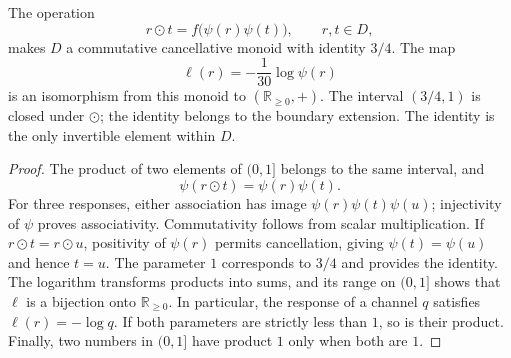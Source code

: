 \begin{proposition}
\label{amp-comp-monoid}
The operation
\begin{equation}
 r\odot t=f\bigl(\psi(r)\psi(t)\bigr),\qquad r,t\in D,
 \label{amp-comp-law}
\end{equation}
makes $D$ a commutative cancellative monoid with identity $3/4$.
The map
\begin{equation}
 \ell(r)=-\frac1{30}\log\psi(r)
 \label{amp-comp-character}
\end{equation}
is an isomorphism from this monoid to $(\mathbb R_{\geq0},+)$.
The interval $(3/4,1)$ is closed under $\odot$; the identity belongs
to the boundary extension. The identity is the only invertible element
within $D$.
\end{proposition}
\begin{proof}
The product of two elements of $(0,1]$ belongs to the same interval, and
\[
 \psi(r\odot t)=\psi(r)\psi(t).
\]
For three responses, either association has image
$\psi(r)\psi(t)\psi(u)$; injectivity of $\psi$ proves associativity.
Commutativity follows from scalar multiplication. If
$r\odot t=r\odot u$, positivity of $\psi(r)$ permits cancellation,
giving $\psi(t)=\psi(u)$ and hence $t=u$. The parameter $1$ corresponds
to $3/4$ and provides the identity. The logarithm transforms products into
sums, and its range on $(0,1]$ shows that $\ell$ is a bijection onto
$\mathbb R_{\geq0}$. In particular, the response of a channel $q$
satisfies $\ell(r)=-\log q$. If both parameters are strictly less than
$1$, so is their product. Finally, two numbers in $(0,1]$ have product
$1$ only when both are $1$.
\end{proof}

